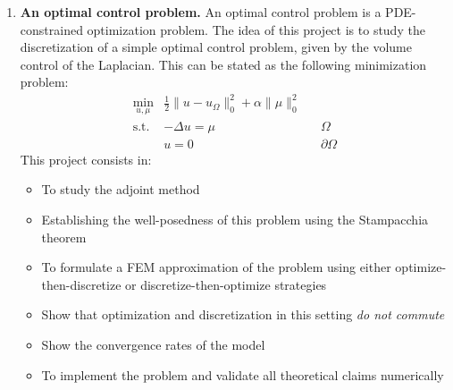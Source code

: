 \documentclass{article}
\begin{document}
\begin{enumerate}
    \item \textbf{An optimal control problem.} An optimal control problem is a PDE-constrained optimization problem. The idea of this project is to study the discretization of a simple optimal control problem, given by the volume control of the Laplacian. This can be stated as the following minimization problem: 
        $$ \begin{aligned} \min_{u,\mu} &\frac 1 2 \|u - u_\Omega\|_0^2 + \alpha \|\mu\|_0^2 && \\
            \text{s.t.} & -\Delta u = \mu &&  \Omega \\
                        & u = 0 && \partial\Omega
        \end{aligned} $$
        This project consists in:
        \begin{itemize}
            \item To study the adjoint method
            \item Establishing the well-posedness of this problem using the Stampacchia theorem
            \item To formulate a FEM approximation of the problem using either optimize-then-discretize or discretize-then-optimize strategies
            \item Show that optimization and discretization in this setting \emph{do not commute}
            \item Show the convergence rates of the model
            \item To implement the problem and validate all theoretical claims numerically
        \end{itemize}
\end{enumerate}

\end{document}
